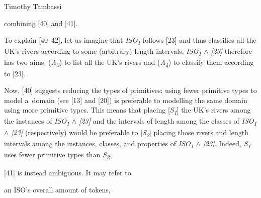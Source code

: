 \begin{artengenv}{Timothy Tambassi}
\begin{enumerate}[label={[\arabic*]}]
\item combining [40] and [41].

\end{enumerate}
\setcounter{saveenumtambassi}{\value{enumi}}

To explain [40–42], let us imagine that \textit{ISO}\textit{\textsubscript{1}} follows [23] and thus classifies all the UK's rivers according to some (arbitrary) length intervals. \textit{ISO}\textit{\textsubscript{1}}\textit{\textcolor[rgb]{0.1254902,0.12941177,0.14117648}{ }}\textit{\textcolor[rgb]{0.1254902,0.12941177,0.14117648}{${\wedge}$}} \textit{[23]} therefore has two aims: (\textit{A}\textit{\textsubscript{3}}) to list all the UK's rivers and (\textit{A}\textit{\textsubscript{4}}) to classify them according to [23].



Now, [40] suggests reducing the types of primitives: using fewer primitive types to model a~domain (see [13] and [20]) is preferable to modelling the same domain using more primitive types. This means that placing [\textit{S}\textit{\textsubscript{1}}] the UK's rivers among the instances of \textit{ISO}\textit{\textsubscript{1}} \textit{${\wedge}$ [23] }and the intervals of length among the classes of \textit{ISO}\textit{\textsubscript{1}} \textit{${\wedge}$ [23]} (respectively) would be preferable to [\textit{S}\textit{\textsubscript{2}}] placing those rivers and length intervals among the instances, classes, and properties of \textit{ISO}\textit{\textsubscript{1}} \textit{${\wedge}$ [23]}. Indeed, \textit{S}\textit{\textsubscript{1}} uses fewer primitive types than \textit{S}\textit{\textsubscript{2}}.



[41] is instead ambiguous. It may refer to


\begin{enumerate}[label={[\arabic*]}]



\item [{[41.1]}] an ISO's overall amount of tokens,

\end{enumerate}


\end{artengenv}
